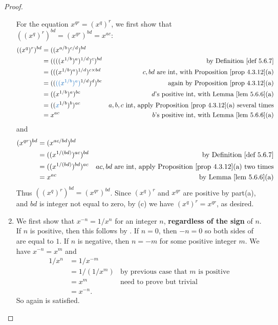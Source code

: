 \begin{proof}
\begin{enumerate}
    For the equation \(x^{qr} = (x^q)^r\), we first show that \(((x^q)^r)^{bd} = (x^{qr})^{bd} = x^{ac}\):
    \begin{align*}
        ((x^q)^r)^{bd} & = ((x^{a/b})^{c/d})^{bd} \\
                       & = ((((x^{1/b})^a)^{1/d})^c)^{bd} & \text{by \DEF{5.6.7}} \\
                       & = (((x^{1/b})^a)^{1/d})^{c \X bd} & \text{\(c, bd\) are int, with \PROP{4.3.12}(a)} \\
                       & = ((\BLUE{((x^{1/b})^a)}^{1/d})^d)^{bc} & \text{again by \PROP{4.3.12}(a)} \\
                       & = ((x^{1/b})^a)^{bc} & \text{\(d\)'s positive int, with \LEM{5.6.6}(a)} \\
                       & = ((\BLUE{x}^{1/b})^b)^{ac} & \text{\(a, b, c\) int, apply \PROP{4.3.12}(a) several times} \\
                       & = x^{ac} & \text{\(b\)'s positive int, with \LEM{5.6.6}(a)}
    \end{align*}
    and
    \begin{align*}
        (x^{qr})^{bd} & = (x^{ac/bd})^{bd} \\
                      & = ((x^{1/(bd)})^{ac})^{bd} & \text{by \DEF{5.6.7}} \\
                      & = ((x^{1/(bd)})^{bd})^{ac} & \text{\(ac, bd\) are int, apply \PROP{4.3.12}(a) two times} \\
                      & = x^{ac} & \text{by \LEM{5.6.6}(a)}
    \end{align*}
    Thus \(((x^q)^r)^{bd} = (x^{qr})^{bd}\).
    Since \((x^q)^r\) and \(x^{qr}\) are positive by part(a), and \(bd\) is integer not equal to zero, by (c) we have \((x^q)^r = x^{qr}\), as desired.
\item
    We first show that \(x^{-n} = 1/x^n\) \BLUE{(*)} for an integer \(n\), \textbf{regardless of the sign} of \(n\).
    If \(n\) is positive, then this follows by .
    If \(n = 0\), then \(-n = 0\) so both sides of \BLUE{(*)} are equal to \(1\).
    If \(n\) is negative, then \(n = -m\) for some positive integer \(m\).
    We have \(x^{-n} = x^{m}\) and
    \begin{align*}
        1/x^n & = 1/x^{-m} \\
              & = 1/(1/x^m) & \text{by previous case that \(m\) is positive} \\
              & = x^m & \text{need to prove but trivial} \\
              & = x^{-n}.
    \end{align*}
    So again \BLUE{(*)} is satisfied.


\end{enumerate}
\end{proof}
